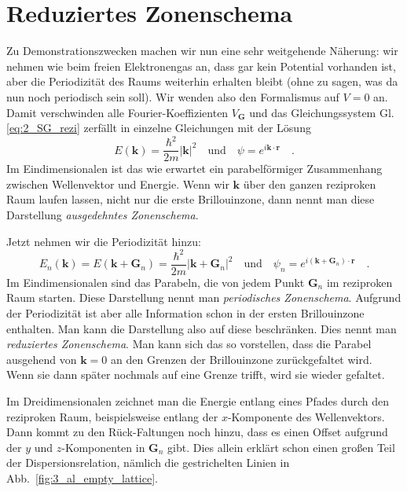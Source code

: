 \section{Reduziertes Zonenschema}

Zu Demonstrationszwecken machen wir nun eine sehr weitgehende Näherung: wir nehmen wie beim freien Elektronengas an, dass gar kein Potential vorhanden ist, aber die Periodizität des Raums weiterhin erhalten bleibt (ohne zu sagen, was da nun noch periodisch sein soll). Wir wenden also den Formalismus auf $V=0$ an. Damit verschwinden alle Fourier-Koeffizienten $V_\mathbf{G}$ und das Gleichungssystem Gl. \ref{eq:2_SG_rezi} zerfällt in einzelne Gleichungen mit der Lösung
\begin{equation}
    E(\mathbf{k}) = \frac{\hbar^2}{2m} \left| \mathbf{k}  \right|^2 
    \quad \text{und} \quad 
    \psi = e^{i \mathbf{k} \cdot \mathbf{r}} \quad .
\end{equation}
Im Eindimensionalen ist das  wie erwartet ein parabelförmiger Zusammenhang zwischen Wellenvektor und Energie. Wenn wir $\mathbf{k}$ über den ganzen reziproken Raum laufen lassen, nicht nur die erste Brillouinzone, dann nennt man diese Darstellung \emph{ausgedehntes Zonenschema}.

Jetzt nehmen wir die Periodizität hinzu:
\begin{equation}
    E_n(\mathbf{k}) = E(\mathbf{k} + \mathbf{G}_n) 
     = \frac{\hbar^2}{2m} \left| \mathbf{k} + \mathbf{G}_n \right|^2 \quad \text{und} \quad \psi_n = e^{i (\mathbf{k} + \mathbf{G}_n) \cdot \mathbf{r}} \quad .
\end{equation}
Im Eindimensionalen sind das Parabeln, die von jedem Punkt  $\mathbf{G}_n $ im reziproken Raum starten. Diese Darstellung nennt man \emph{periodisches Zonenschema}. Aufgrund der Periodizität ist aber alle Information schon in der ersten Brillouinzone enthalten. Man kann die Darstellung also auf diese beschränken. Dies nennt man  \emph{reduziertes Zonenschema}. Man kann sich das so vorstellen, dass die Parabel ausgehend von  $\mathbf{k} = 0$  an den Grenzen der Brillouinzone zurückgefaltet wird. Wenn sie dann später nochmals auf eine Grenze trifft, wird sie wieder gefaltet.


Im Dreidimensionalen zeichnet man die Energie entlang eines Pfades durch den reziproken Raum, beispielsweise entlang der $x$-Komponente des Wellenvektors. Dann 
kommt zu den Rück-Faltungen noch hinzu, dass es einen Offset aufgrund der $y$ und $z$-Komponenten in $\mathbf{G}_n $ gibt. Dies allein erklärt schon einen großen Teil der Dispersionsrelation, nämlich die gestrichelten Linien in Abb.~\ref{fig:3_al_empty_lattice}.

